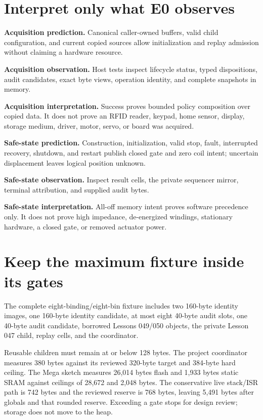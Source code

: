 \documentclass[10pt]{article}
\begin{document}
\newpage
\section{Interpret only what E0 observes}
\textbf{Acquisition prediction.} Canonical caller-owned buffers, valid child
configuration, and current copied sources allow initialization and replay
admission without claiming a hardware resource.

\textbf{Acquisition observation.} Host tests inspect lifecycle status,
typed dispositions, audit candidates, exact byte views, operation identity,
and complete snapshots in memory.

\textbf{Acquisition interpretation.} Success proves bounded policy
composition over copied data. It does not prove an RFID reader, keypad, home
sensor, display, storage medium, driver, motor, servo, or board was acquired.

\textbf{Safe-state prediction.} Construction, initialization, valid stop,
fault, interrupted recovery, shutdown, and restart publish closed gate and
zero coil intent; uncertain displacement leaves logical position unknown.

\textbf{Safe-state observation.} Inspect result cells, the private sequencer
mirror, terminal attribution, and supplied audit bytes.

\textbf{Safe-state interpretation.} All-off memory intent proves software
precedence only. It does not prove high impedance, de-energized windings,
stationary hardware, a closed gate, or removed actuator power.

\section{Keep the maximum fixture inside its gates}
The complete eight-binding/eight-bin fixture includes two 160-byte identity
images, one 160-byte identity candidate, at most eight 40-byte audit slots,
one 40-byte audit candidate, borrowed Lessons 049/050 objects, the private
Lesson 047 child, replay cells, and the coordinator.

Reusable children must remain at or below 128 bytes. The project coordinator
measures 380 bytes against its reviewed 320-byte target and 384-byte hard
ceiling. The Mega sketch measures 26,014 bytes flash and 1,933 bytes static
SRAM against ceilings of 28,672 and 2,048 bytes. The conservative live
stack/ISR path is 742 bytes and the reviewed reserve is 768 bytes, leaving
5,491 bytes after globals and that rounded reserve. Exceeding a gate stops for
design review; storage does not move to the heap.
\end{document}
